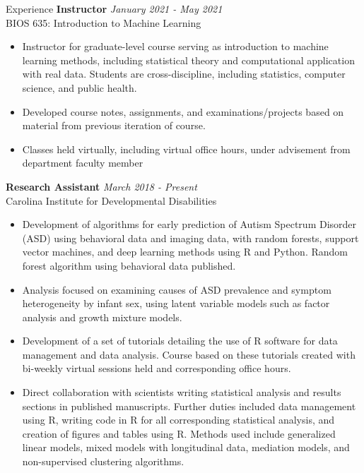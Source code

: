 \documentclass{resume} %
\begin{document}
\begin{rSection}{Experience}
{\bf Instructor} \hfill {\em January 2021 - May 2021} 
\\ BIOS 635: Introduction to Machine Learning
\begin{itemize}
    \item Instructor for graduate-level course serving as introduction to machine learning methods, including statistical theory and computational application with real data.  Students are cross-discipline, including statistics, computer science, and public health.
    \item Developed course notes, assignments, and examinations/projects based on material from previous iteration of course.
    \item Classes held virtually, including virtual office hours, under advisement from department faculty member
\end{itemize}
{\bf Research Assistant} \hfill {\em March 2018 - Present}
\\ Carolina Institute for Developmental Disabilities
\begin{itemize}
    \item Development of algorithms for early prediction of Autism Spectrum Disorder (ASD) using behavioral data and imaging data, with random forests, support vector machines, and deep learning methods using R and Python.  Random forest algorithm using behavioral data published.
    \item Analysis focused on examining causes of ASD prevalence and symptom heterogeneity by infant sex, using latent variable models such as factor analysis and growth mixture models.
    \item Development of a set of tutorials detailing the use of R software for data management and data analysis.  Course based on these tutorials created with bi-weekly virtual sessions held and corresponding office hours.
    \item Direct collaboration with scientists writing statistical analysis and results sections in published manuscripts.  Further duties included data management using R, writing code in R for all corresponding statistical analysis, and creation of figures and tables using R.  Methods used include generalized linear models, mixed models with longitudinal data, mediation models, and non-supervised clustering algorithms.

\end{itemize}
\end{rSection}
\end{document}
